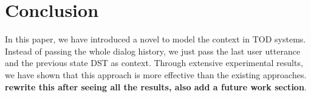 
\section{Conclusion}

In this paper, we have introduced a novel to model the context in TOD systems. Instead of passing the whole dialog history, we just
pass the last user utterance and the previous state DST as context. Through extensive experimental results,
we have shown that this approach is more effective than the existing approaches. \textbf{rewrite this after seeing all the results, also add a future work section}.